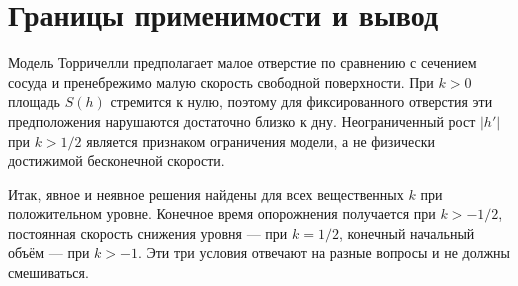 ﻿\documentclass[12pt,a4paper]{article}
\begin{document}
\section{Границы применимости и вывод}
Модель Торричелли предполагает малое отверстие по сравнению с сечением сосуда и пренебрежимо малую скорость свободной поверхности. При $k>0$ площадь $S(h)$ стремится к нулю, поэтому для фиксированного отверстия эти предположения нарушаются достаточно близко к дну. Неограниченный рост $|h'|$ при $k>1/2$ является признаком ограничения модели, а не физически достижимой бесконечной скорости.

Итак, явное и неявное решения найдены для всех вещественных $k$ при положительном уровне. Конечное время опорожнения получается при $k>-1/2$, постоянная скорость снижения уровня --- при $k=1/2$, конечный начальный объём --- при $k>-1$. Эти три условия отвечают на разные вопросы и не должны смешиваться.
\end{document}
